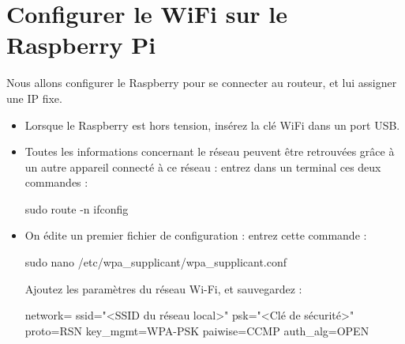 \documentclass[12pt,a4paper]{report}
\begin{document}
\section{Configurer le WiFi sur le Raspberry Pi}

Nous allons configurer le Raspberry pour se connecter au routeur, et lui assigner une IP fixe.

\begin{itemize}
\item Lorsque le Raspberry est hors tension, insérez la clé WiFi dans un port USB.
%
%
%

\item Toutes les informations concernant le réseau peuvent être retrouvées grâce à un autre appareil connecté à ce réseau : entrez dans un terminal ces deux commandes :

\bigbreak
\begin{verbatimtab}[3]
sudo route -n
ifconfig
\end{verbatimtab}
\bigbreak

\item On édite un premier fichier de configuration : entrez cette commande : 

\bigbreak
\begin{verbatimtab}[3]
sudo nano /etc/wpa_supplicant/wpa_supplicant.conf
\end{verbatimtab}
\bigbreak

Ajoutez les paramètres du réseau Wi-Fi, et sauvegardez :

\begin{verbatimtab}[3]
network={
	ssid="<SSID du réseau local>"
	psk="<Clé de sécurité>"
	proto=RSN
	key_mgmt=WPA-PSK
	paiwise=CCMP
	auth_alg=OPEN
}
\end{verbatimtab}


\end{itemize}
\end{document}

